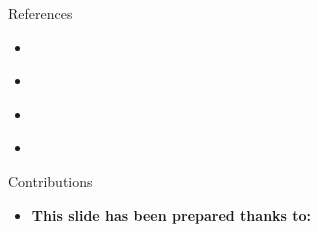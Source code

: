 \documentclass[serif, aspectratio=169]{beamer}
\begin{document}
\begin{frame}{References}
    \begin{itemize}
        \item \cite{M2006-mk}
        \item \cite{MITNeuroscienceLecture2014}
        \item \cite{SontagMLLecture2012}
        \item \cite{soleymaniMLCourse}
        
    \end{itemize}
\end{frame}

\begin{frame}{Contributions}
\begin{itemize}
\item \textbf{This slide has been prepared thanks to:}
\begin{itemize}
\end{itemize}
\end{itemize}

\end{frame}

\begin{frame}[allowframebreaks]
    
    
    \nocite{*}
\end{frame}
\end{document}
